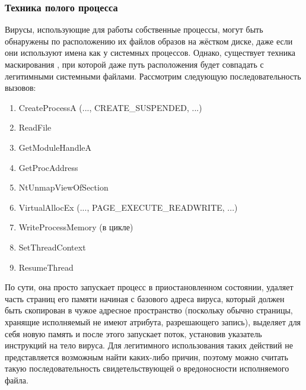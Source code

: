 \subsubsection {Техника полого процесса}
Вирусы, использующие для работы собственные процессы, могут быть обнаружены по расположению их файлов образов на жёстком диске, даже если они используют имена как у системных процессов. Однако, существует техника маскирования \cite{MALWAREBOOK}, при которой даже путь расположения будет совпадать с легитимными системными файлами.
Рассмотрим следующую последовательность вызовов:
\begin {enumerate}
	\item CreateProcessA (..., CREATE\_SUSPENDED, ...)
	\item ReadFile
	\item GetModuleHandleA
	\item GetProcAddress
	\item NtUnmapViewOfSection
	\item VirtualAllocEx (..., PAGE\_EXECUTE\_READWRITE, ...)
	\item WriteProcessMemory (в цикле)
	\item SetThreadContext
	\item ResumeThread
\end{enumerate}
По сути, она просто запускает процесс в приостановленном состоянии, удаляет часть страниц его памяти начиная с базового адреса вируса, который должен быть скопирован в чужое адресное пространство (поскольку обычно страницы, хранящие исполняемый не имеют атрибута, разрешающего запись), выделяет для себя новую память и после этого запускает поток, установив указатель инструкций на тело вируса. Для легитимного использования таких действий не представляется возможным найти каких-либо причин, поэтому можно считать такую последовательность свидетельствующей о вредоносности исполняемого файла.